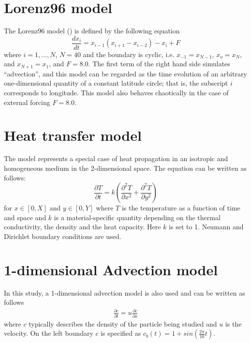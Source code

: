 \section{Lorenz96 model}
The Lorenz96 model (\cite{LorenzEmanuel1998}) is defined by the following
equation
\begin{equation}
  \frac{dx_i}{dt}=x_{i-1}(x_{i+1}-x_{i-2})-x_{i}+F
\end{equation}
where $i=1,...,N$, $N=40$ and the boundary is cyclic, i.e. $x_{-1}=x_{N-1}$,
$x_{o}=x_{N}$, and $x_{N+1}=x_{1}$, and $F=8.0$. The first term of the right
hand side simulates ``advection'', and this model can be regarded as the time
evolution of an arbitrary one-dimensional quantity of a constant latitude
circle; that is, the subscript $i$ corresponds to longitude. This model also
behaves chaotically in the case of external forcing $F=8.0$.

\section{Heat transfer model}
The model represents a special case of heat propagation in an isotropic and
homogeneous medium in the 2-dimensional space. The equation can be written as
follows:
\begin{equation}
  \frac{\partial T}{\partial t}=k(\frac{\partial^2 T}{\partial x^2}+\frac{\partial^2 T}{\partial y^2})
\end{equation}
for $x \in [0,X]$ and $y \in [0,Y]$ where $T$ is the temperature as a function
of time and space and $k$ is a material-specific quantity depending on the
thermal conductivity, the density and the heat capacity. Here $k$ is set to 1.
Neumann and Dirichlet boundary conditions are used.

\section{1-dimensional Advection model}
In this study, a 1-dimensional advection model is also used and can be written as follows
\begin{eqnarray}
  \frac{\partial c}{\partial t}=u \frac{\partial c}{\partial x}
\end{eqnarray}
where $c$ typically describes the density of the particle being studied and $u$
is the velocity. On the left boundary $c$ is specified as
$c_b(t)=1+sin(\frac{2\pi}{10}t)$.


